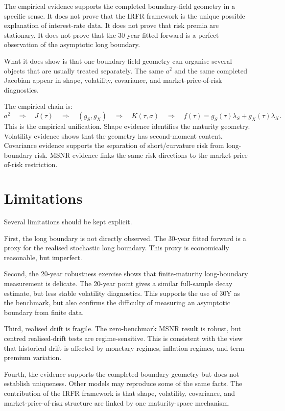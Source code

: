 \documentclass[11pt,oneside]{book}
\begin{document}
The empirical evidence supports the completed boundary-field geometry in a specific sense. It does not prove that the IRFR framework is the unique possible explanation of interest-rate data. It does not prove that risk premia are stationary. It does not prove that the 30-year fitted forward is a perfect observation of the asymptotic long boundary.

What it does show is that one boundary-field geometry can organise several objects that are usually treated separately. The same \(a^2\) and the same completed Jacobian appear in shape, volatility, covariance, and market-price-of-risk diagnostics.

The empirical chain is:
\[
a^2
\quad\Rightarrow\quad
J(\tau)
\quad\Rightarrow\quad
(g_S,g_X)
\quad\Rightarrow\quad
K(\tau,\sigma)
\quad\Rightarrow\quad
f(\tau)=g_S(\tau)\lambda_S+g_X(\tau)\lambda_X.
\]
This is the empirical unification. Shape evidence identifies the maturity geometry. Volatility evidence shows that the geometry has second-moment content. Covariance evidence supports the separation of short/curvature risk from long-boundary risk. MSNR evidence links the same risk directions to the market-price-of-risk restriction.

\section{Limitations}

Several limitations should be kept explicit.

First, the long boundary is not directly observed. The 30-year fitted forward is a proxy for the realised stochastic long boundary. This proxy is economically reasonable, but imperfect.

Second, the 20-year robustness exercise shows that finite-maturity long-boundary measurement is delicate. The 20-year point gives a similar full-sample decay estimate, but less stable volatility diagnostics. This supports the use of 30Y as the benchmark, but also confirms the difficulty of measuring an asymptotic boundary from finite data.

Third, realised drift is fragile. The zero-benchmark MSNR result is robust, but centred realised-drift tests are regime-sensitive. This is consistent with the view that historical drift is affected by monetary regimes, inflation regimes, and term-premium variation.

Fourth, the evidence supports the completed boundary geometry but does not establish uniqueness. Other models may reproduce some of the same facts. The contribution of the IRFR framework is that shape, volatility, covariance, and market-price-of-risk structure are linked by one maturity-space mechanism.
\end{document}
